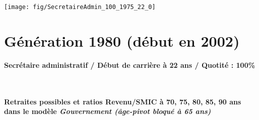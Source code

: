  \vspace{0.1cm} 

 {\hspace{-2.2cm}\texttt{[image: fig/SecretaireAdmin\_100\_1975\_22\_0]}} 

\newpage 
 
\section{Génération 1980 (début en 2002)\label{SecretaireAdmin_100_1980_22_0}} 
 
{\bf \noindent Secrétaire administratif / Début de carrière à 22 ans / Quotité : 100\%}  ~ 

 ~\\{\bf \noindent Retraites possibles et ratios Revenu/SMIC à 70, 75, 80, 85, 90 ans dans le modèle \emph{Gouvernement (âge-pivot bloqué à 65 ans)}}  
 
